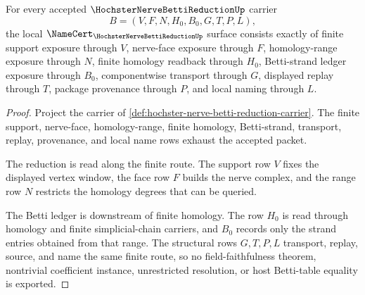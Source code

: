 \begin{theorem}
\label{thm:hochster-nerve-betti-reduction-namecert-obligations}
For every accepted $\HochsterNerveBettiReductionUp$ carrier
$$
B=(V,F,N,H_0,B_0,G,T,P,L),
$$
the local $\NameCert_{\HochsterNerveBettiReductionUp}$ surface consists exactly of finite support exposure through $V$, nerve-face exposure through $F$, homology-range exposure through $N$, finite homology readback through $H_0$, Betti-strand ledger exposure through $B_0$, componentwise transport through $G$, displayed replay through $T$, package provenance through $P$, and local naming through $L$.
\end{theorem}
\begin{proof}
Project the carrier of \autoref{def:hochster-nerve-betti-reduction-carrier}. The finite support, nerve-face, homology-range, finite homology, Betti-strand, transport, replay, provenance, and local name rows exhaust the accepted packet.

The reduction is read along the finite route. The support row $V$ fixes the displayed vertex window, the face row $F$ builds the nerve complex, and the range row $N$ restricts the homology degrees that can be queried.

The Betti ledger is downstream of finite homology. The row $H_0$ is read through homology and finite simplicial-chain carriers, and $B_0$ records only the strand entries obtained from that range. The structural rows $G,T,P,L$ transport, replay, source, and name the same finite route, so no field-faithfulness theorem, nontrivial coefficient instance, unrestricted resolution, or host Betti-table equality is exported.
\end{proof}

